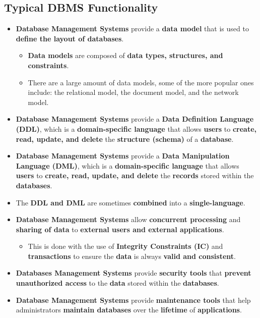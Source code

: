 \documentclass{article}
\begin{document}
    \subsection*{Typical DBMS Functionality}
    \begin{itemize}
        \item \textbf{Database Management Systems} provide a \textbf{data model} that is used to \textbf{define the layout of databases}.
        \begin{itemize}
            \item \textbf{Data models} are composed of \textbf{data types, structures, and constraints}.
            \item There are a large amount of data models, some of the more popular ones include: the relational model, the document model, and the network model.
        \end{itemize}
        \item \textbf{Database Management Systems} provide a \textbf{Data Definition Language (DDL)}, which is a \textbf{domain-specific language} that allows \textbf{users} to \textbf{create, read, update, and delete} the \textbf{structure (schema)} of a \textbf{database}.
        \item \textbf{Database Management Systems} provide a \textbf{Data Manipulation Language (DML)}, which is a \textbf{domain-specific language} that allows \textbf{users} to \textbf{create, read, update, and delete} the \textbf{records} stored within the \textbf{databases}.
        \item The \textbf{DDL and DML} are sometimes \textbf{combined} into a \textbf{single-language}.
        \item \textbf{Database Management Systems} allow \textbf{concurrent processing} and \textbf{sharing of data} to \textbf{external users and external applications}.
        \begin{itemize}
            \item This is done with the use of \textbf{Integrity Constraints (IC)} and \textbf{transactions} to ensure the \textbf{data} is always \textbf{valid and consistent}.
        \end{itemize}
        \item \textbf{Databases Management Systems} provide \textbf{security tools} that \textbf{prevent unauthorized access} to the \textbf{data} stored within the \textbf{databases}.
        \item \textbf{Database Management Systems} provide \textbf{maintenance tools} that help administrators \textbf{maintain databases} over the \textbf{lifetime} of \textbf{applications}.
    \end{itemize}
\end{document}
